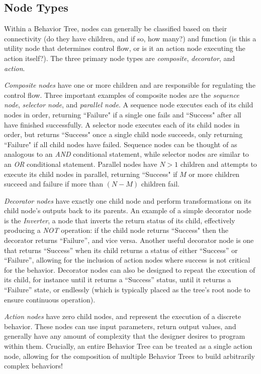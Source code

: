 \subsection{Node Types}
Within a Behavior Tree, nodes can generally be classified based on their connectivity (do they have children, and if so, how many?) and function (is this a utility node that determines control flow, or is it an action node executing the action itself?). The three primary node types are \emph{composite}, \emph{decorator}, and \emph{action}.

\emph{Composite nodes} have one or more children and are responsible for regulating the control flow. Three important examples of composite nodes are the \emph{sequence node}, \emph{selector node}, and \emph{parallel node}. A sequence node executes each of its child nodes in order, returning ``Failure" if a single one fails and ``Success" after all have finished successfully. A selector node executes each of its child nodes in order, but returns ``Success" once a single child node succeeds, only returning ``Failure" if all child nodes have failed. Sequence nodes can be thought of as analogous to an \emph{AND} conditional statement, while selector nodes are similar to an \emph{OR} conditional statement. Parallel nodes have $N>1$ children and attempts to execute its child nodes in parallel, returning ``Success" if $M$ or more children succeed and failure if more than $(N-M)$ children fail.

\emph{Decorator nodes} have exactly one child node and perform transformations on its child node's outputs back to its parents. An example of a simple decorator node is the \emph{Inverter}, a node that inverts the return status of its child, effectively producing a \emph{NOT} operation: if the child node returns ``Success" then the decorator returns ``Failure'', and vice versa. Another useful decorator node is one that returns ``Success'' when its child returns a status of either ``Success'' or ``Failure'', allowing for the inclusion of action nodes where success is not critical for the behavior. Decorator nodes can also be designed to repeat the execution of its child, for instance until it returns a ``Success'' status, until it returns a ``Failure'' state, or endlessly (which is typically placed as the tree's root node to ensure continuous operation).

\emph{Action nodes} have zero child nodes, and represent the execution of a discrete behavior. These nodes can use input parameters, return output values, and generally have any amount of complexity that the designer desires to program within them. Crucially, an entire Behavior Tree can be treated as a single action node, allowing for the composition of multiple Behavior Trees to build arbitrarily complex behaviors!

